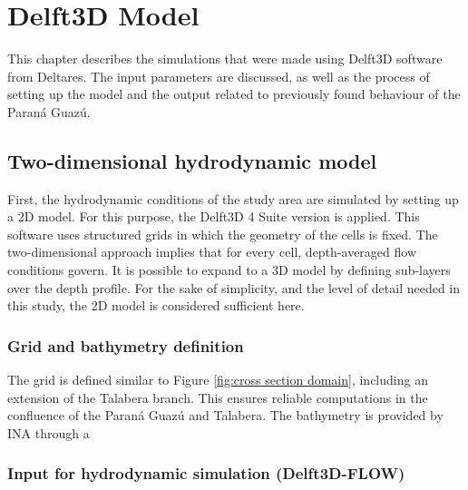 \chapter{Delft3D Model}
\label{chap:Delft3DModel}
This chapter describes the simulations that were made using Delft3D software from Deltares. The input parameters are discussed, as well as the process of setting up the model and the output related to previously found behaviour of the Paraná Guazú. 

\section{Two-dimensional hydrodynamic model}
First, the hydrodynamic conditions of the study area are simulated by setting up a 2D model. For this purpose, the Delft3D 4 Suite version is applied. This software uses structured grids in which the geometry of the cells is fixed. The two-dimensional approach implies that for every cell, depth-averaged flow conditions govern. It is possible to expand to a 3D model by defining sub-layers over the depth profile. For the sake of simplicity, and the level of detail needed in this study, the 2D model is considered sufficient here. 

\subsection{Grid and bathymetry definition}
The grid is defined similar to Figure \ref{fig:cross section domain}, including an extension of the Talabera branch. This ensures reliable computations in the confluence of the Paraná Guazú and Talabera. The bathymetry is provided by INA through a  


\subsection{Input for hydrodynamic simulation (Delft3D-FLOW)}
